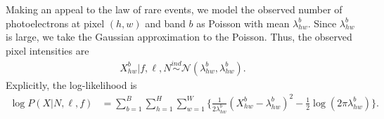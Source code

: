 Making an appeal to the law of rare events, we model the
observed number of photoelectrons at pixel $(h,w)$ and band $b$ as Poisson
with mean $\lambda^b_{hw}$. Since $\lambda^b_{hw}$ is large,
we take the Gaussian approximation to the Poisson.
Thus, the observed pixel intensities are
\begin{align}
  X_{hw}^b | f, \ell, N \overset{ind}{\sim} \mathcal{N}(\lambda^b_{hw}, \lambda^b_{hw}).
\end{align}
Explicitly, the log-likelihood is
\begin{align}
    \log P(X | N, \ell, f) &= \sum_{b = 1}^{B} \sum_{h = 1}^H \sum_{w = 1}^W 
        \Big\{\frac{1}{2\lambda^b_{hw}}(X_{hw}^b  - \lambda^b_{hw})^2 - 
               \frac{1}{2}\log(2\pi\lambda^b_{hw})\Big\}
    \label{eq:loglik}.
\end{align}